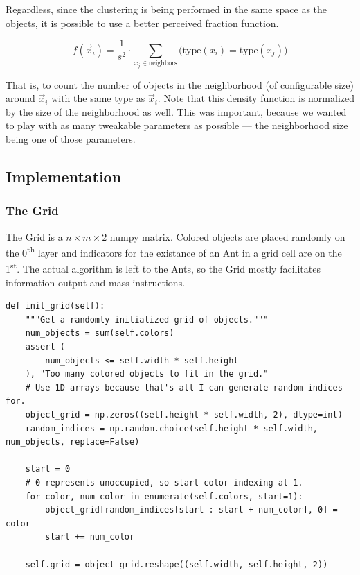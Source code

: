\documentclass[12pt]{article}
\begin{document}
Regardless, since the clustering is being performed in the same space as the objects, it is possible to use a better perceived fraction function.

\begin{equation}
    f(\vec x_i) = \frac{1}{s^2}\cdot\sum_{x_j \in \text{neighbors}}\bigg(\mathrm{type}(x_i) = \mathrm{type}(x_j)\bigg)\label{eq:aca:density}
\end{equation}

That is, to count the number of objects in the neighborhood (of configurable size) around $\vec x_i$ with the same type as $\vec x_i$.
Note that this density function is normalized by the size of the neighborhood as well.
This was important, because we wanted to play with as many tweakable parameters as possible --- the neighborhood size being one of those parameters.

\subsection{Implementation}

\subsubsection{The Grid}
The Grid is a \(n \times m \times 2\) numpy matrix.
Colored objects are placed randomly on the 0\textsuperscript{th} layer and indicators for the existance of an Ant in a grid cell are on the 1\textsuperscript{st}.
The actual algorithm is left to the Ants, so the Grid mostly facilitates information output and mass instructions.


\begin{verbatim}
def init_grid(self):
    """Get a randomly initialized grid of objects."""
    num_objects = sum(self.colors)
    assert (
        num_objects <= self.width * self.height
    ), "Too many colored objects to fit in the grid."
    # Use 1D arrays because that's all I can generate random indices for.
    object_grid = np.zeros((self.height * self.width, 2), dtype=int)
    random_indices = np.random.choice(self.height * self.width, num_objects, replace=False)

    start = 0
    # 0 represents unoccupied, so start color indexing at 1.
    for color, num_color in enumerate(self.colors, start=1):
        object_grid[random_indices[start : start + num_color], 0] = color
        start += num_color

    self.grid = object_grid.reshape((self.width, self.height, 2))
\end{verbatim}
\end{document}
